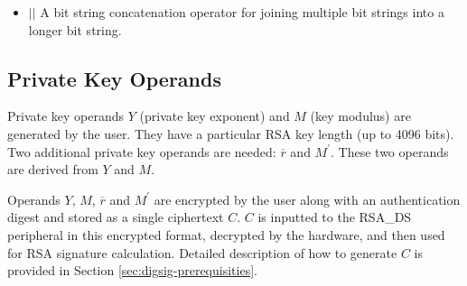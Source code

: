 \documentclass[main\_\_EN.tex]{subfiles}
\begin{document}
\begin{itemize}
    \item
        \begin{math}{ || }\end{math}  \hspace{1.0cm}      A bit string concatenation operator for joining multiple bit strings into a longer bit string.
\end{itemize}



\subsection{Private Key Operands}
\label{sec:digsig-private-key-operands}

Private key operands \begin{math}Y\end{math} (private key exponent) and \begin{math}M\end{math} (key modulus) are generated by the user. They have a particular RSA key length (up to 4096 bits).
Two additional private key operands are needed: \begin{math}\overline{r}\end{math} and \begin{math}M^{\prime}\end{math}. These two operands are derived from \begin{math}Y\end{math} and \begin{math}M\end{math}.


Operands \begin{math}Y\end{math}, \begin{math}M\end{math}, \begin{math}\overline{r}\end{math} and \begin{math}M^{\prime}\end{math} are encrypted by the user along with an authentication digest and stored as a single ciphertext \begin{math}C\end{math}. \begin{math}C\end{math} is inputted to the RSA\_DS peripheral in this encrypted format, decrypted by the hardware, and then used for RSA signature calculation. Detailed description of how to generate \begin{math}C\end{math} is provided in Section \ref{sec:digsig-prerequisities}.
\end{document}
